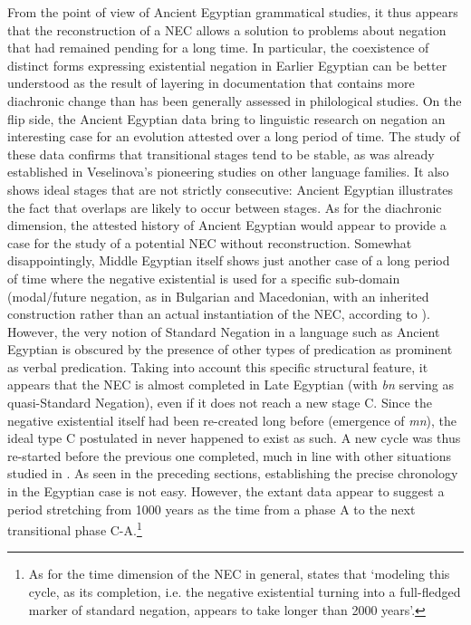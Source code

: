 \documentclass[output=paper]{langsci/langscibook}
\begin{document}
From the point of view of Ancient Egyptian grammatical studies, it thus appears that the reconstruction of a NEC allows a solution to problems about negation that had remained pending for a long time. In particular, the coexistence of distinct forms expressing existential negation in Earlier Egyptian can be better understood as the result of layering in documentation that contains more diachronic change than has been generally assessed in philological studies. On the flip side, the Ancient Egyptian data bring to linguistic research on negation an interesting case for an evolution attested over a long period of time. The study of these data confirms that transitional stages tend to be stable, as was already established in Veselinova’s pioneering studies on other language families. It also shows ideal stages that are not strictly consecutive: Ancient Egyptian illustrates the fact that overlaps are likely to occur between stages. As for the diachronic dimension, the attested history of Ancient Egyptian would appear to provide a case for the study of a potential NEC without reconstruction. Somewhat disappointingly, Middle Egyptian itself shows just another case of a long period of time where the negative existential is used for a specific sub-domain (modal/future negation, as in Bulgarian and Macedonian, with an inherited construction rather than an actual instantiation of the NEC, according to \citet{Veselinova2014}). However, the very notion of Standard Negation in a language such as Ancient Egyptian is obscured by the presence of other types of predication as prominent as verbal predication. Taking into account this specific structural feature, it appears that the NEC is almost completed in Late Egyptian (with \textit{bn} serving as quasi-Standard Negation), even if it does not reach a new stage C. Since the negative existential itself had been re-created long before (emergence of \textit{mn}), the ideal type C postulated in \citet{Croft1991} never happened to exist as such. A new cycle was thus re-started before the previous one completed, much in line with other situations studied in \citet{Veselinova2016}. As seen in the preceding sections, establishing the precise chronology in the Egyptian case is not easy. However, the extant data appear to suggest a period stretching from 1000 years as the time from a phase A to the next transitional phase C-A.\footnote{As for the time dimension of the NEC in general, \citet[1327]{Veselinova2014} states that ‘modeling this cycle, as its completion, i.e. the negative existential turning into a full-fledged marker of standard negation, appears to take longer than 2000 years’. }  
 
\end{document}
